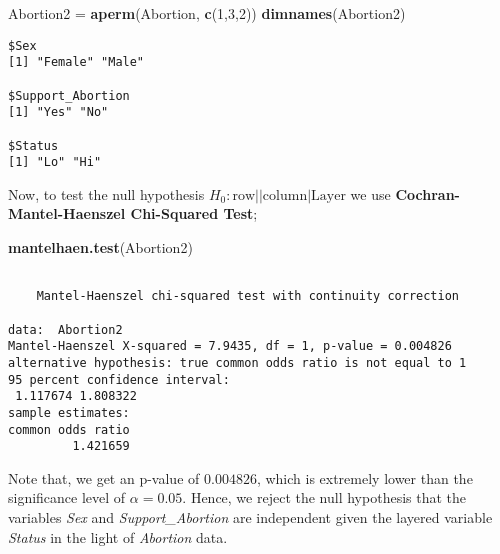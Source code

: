 \documentclass[]{article}
\newenvironment{Shaded}{\begin{snugshade}}{\end{snugshade}}
\newcommand{\KeywordTok}[1]{\textcolor[rgb]{0.13,0.29,0.53}{\textbf{#1}}}
\newcommand{\DecValTok}[1]{\textcolor[rgb]{0.00,0.00,0.81}{#1}}
\newcommand{\StringTok}[1]{\textcolor[rgb]{0.31,0.60,0.02}{#1}}
\newcommand{\NormalTok}[1]{#1}
\begin{document}
\begin{Shaded}
\begin{Highlighting}[]
\NormalTok{Abortion2 =}\StringTok{ }\KeywordTok{aperm}\NormalTok{(Abortion, }\KeywordTok{c}\NormalTok{(}\DecValTok{1}\NormalTok{,}\DecValTok{3}\NormalTok{,}\DecValTok{2}\NormalTok{))}
\KeywordTok{dimnames}\NormalTok{(Abortion2)}
\end{Highlighting}
\end{Shaded}

\begin{verbatim}
$Sex
[1] "Female" "Male"  

$Support_Abortion
[1] "Yes" "No" 

$Status
[1] "Lo" "Hi"
\end{verbatim}

Now, to test the null hypothesis
\(H_0: \text{row}||\text{column}|\text{Layer}\) we use
\textbf{Cochran-Mantel-Haenszel Chi-Squared Test};

\begin{Shaded}
\begin{Highlighting}[]
\KeywordTok{mantelhaen.test}\NormalTok{(Abortion2)}
\end{Highlighting}
\end{Shaded}

\begin{verbatim}

    Mantel-Haenszel chi-squared test with continuity correction

data:  Abortion2
Mantel-Haenszel X-squared = 7.9435, df = 1, p-value = 0.004826
alternative hypothesis: true common odds ratio is not equal to 1
95 percent confidence interval:
 1.117674 1.808322
sample estimates:
common odds ratio 
         1.421659 
\end{verbatim}

Note that, we get an p-value of \(0.004826\), which is extremely lower
than the significance level of \(\alpha = 0.05\). Hence, we reject the
null hypothesis that the variables \emph{Sex} and
\emph{Support\_Abortion} are independent given the layered variable
\emph{Status} in the light of \emph{Abortion} data.
\end{document}
